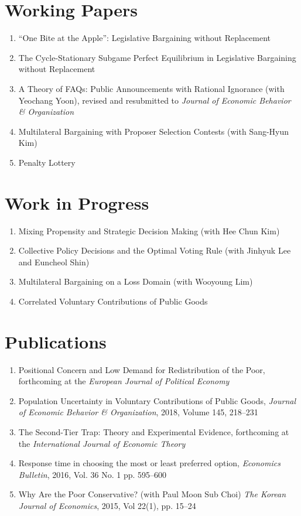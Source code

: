 \documentclass[margin, letterpaper]{res}
\begin{document}
\begin{resume}
\section{Working Papers}
\begin{enumerate}
\item ``One Bite at the Apple'': Legislative Bargaining without Replacement%
\item The Cycle-Stationary Subgame Perfect Equilibrium in Legislative Bargaining without Replacement%
\item A Theory of FAQs: Public Announcements with Rational Ignorance (with Yeochang Yoon), revised and resubmitted to \emph{Journal of Economic Behavior \& Organization}
\item Multilateral Bargaining with Proposer Selection Contests (with Sang-Hyun Kim)%
\item Penalty Lottery%
\end{enumerate}

\section{Work in Progress}
\begin{enumerate}
\item Mixing Propensity and Strategic Decision Making (with Hee Chun Kim)
\item Collective Policy Decisions and the Optimal Voting Rule (with Jinhyuk Lee and Euncheol Shin)
\item Multilateral Bargaining on a Loss Domain (with Wooyoung Lim)
\item Correlated Voluntary Contributions of Public Goods
\end{enumerate}

\section{Publications}
\begin{enumerate}
\item Positional Concern and Low Demand for Redistribution of the Poor, forthcoming at the \emph{European Journal of Political Economy}
\item Population Uncertainty in Voluntary Contributions of Public Goods, \emph{Journal of Economic Behavior \& Organization}, 2018, Volume 145, 218--231
\item The Second-Tier Trap: Theory and Experimental Evidence, forthcoming at the \emph{International Journal of Economic Theory}
\item Response time in choosing the most or least preferred option, \textit{Economics Bulletin}, 2016, Vol. 36 No. 1 pp. 595--600
\item Why Are the Poor Conservative? (with Paul Moon Sub Choi) \textit{The Korean Journal of Economics}, 2015, Vol 22(1), pp. 15--24
\end{enumerate}


\end{resume}
\end{document}
